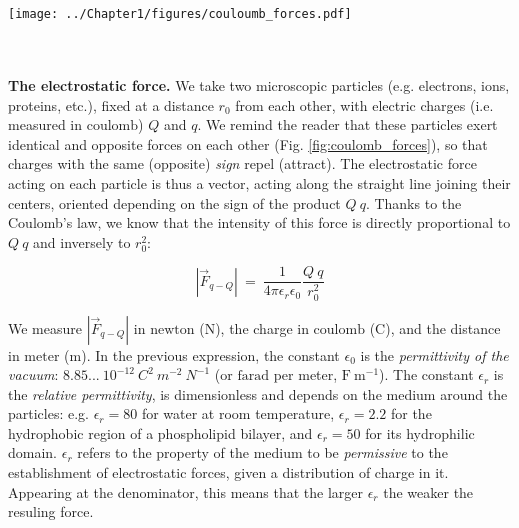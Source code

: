 \\
\\
\begin{minipage}[c]{\linewidth}
\centering
\texttt{[image: ../Chapter1/figures/couloumb\_forces.pdf]}
\label{fig:coulomb_forces}
\end{minipage}
\\
\\
\textbf{The electrostatic force.}  We take two microscopic particles (e.g. electrons, ions, proteins, etc.), fixed at a distance $r_0$ from each other, with electric charges (i.e. measured in \(\mathrm{coulomb}\)) \(Q\) and \(q\). We remind the reader that these particles exert identical and opposite forces on each other (Fig. \ref{fig:coulomb_forces}), so that charges with the same (opposite) \textit{sign} repel (attract). The electrostatic force acting on each particle is thus a vector, acting along the straight line joining their centers, oriented depending on the sign of the product \(Q\ q\). Thanks to the Coulomb's law, we know that the intensity of this force is directly proportional to \(Q\ q\) and inversely to \(r_0^2\):

$$|\vec{F}_{q-Q}|\ =\ \frac{1}{4 \pi \epsilon_r \epsilon_0} \frac{Q\ q}{r_0^2}$$

We measure $|\vec{F}_{q-Q}|$ in $\mathrm{newton}$ ($\mathrm{N}$), the charge in $\mathrm{coulomb}$ ($\mathrm{C}$), and the distance in $\mathrm{meter}$ ($\mathrm{m}$). In the previous expression, the constant $\epsilon_0$ is the \textit{permittivity of the vacuum}: $8.85...\ 10^{-12}\ C^2\ m^{-2}\ N^{-1}$ (or $\mathrm{farad}$ per meter, $\mathrm{F\ m^{-1}}$). The constant $\epsilon_r$ is the \textit{relative permittivity}, is dimensionless and depends on the medium around the particles: e.g. $\epsilon_r = 80$ for water at room temperature, $\epsilon_r = 2.2$ for the hydrophobic region of a phospholipid bilayer, and $\epsilon_r = 50$ for its hydrophilic domain. $\epsilon_r$ refers to the property of the medium to be \textit{permissive} to the establishment of electrostatic forces, given a distribution of charge in it. Appearing at the denominator, this means that the larger $\epsilon_r$ the weaker the resuling force. 

